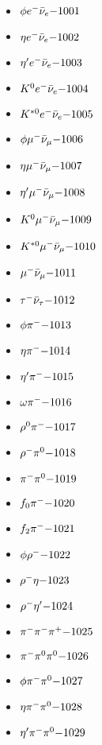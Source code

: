 
 \begin{multicols}{3} 
 \begin{itemize}
 \item $ \phi e^{-} \bar{\nu}_{e} \hfill{-1001}$
 \item $ \eta e^{-} \bar{\nu}_{e} \hfill{-1002}$
 \item $ {\eta^{\prime}} e^{-} \bar{\nu}_{e} \hfill{-1003}$
 \item $ K^{0} e^{-} \bar{\nu}_{e} \hfill{-1004}$
 \item $ K^{*0} e^{-} \bar{\nu}_{e} \hfill{-1005}$
 \item $ \phi \mu^{-} \bar{\nu}_{\mu} \hfill{-1006}$
 \item $ \eta \mu^{-} \bar{\nu}_{\mu} \hfill{-1007}$
 \item $ {\eta^{\prime}} \mu^{-} \bar{\nu}_{\mu} \hfill{-1008}$
 \item $ K^{0} \mu^{-} \bar{\nu}_{\mu} \hfill{-1009}$
 \item $ K^{*0} \mu^{-} \bar{\nu}_{\mu} \hfill{-1010}$
 \item $ \mu^{-} \bar{\nu}_{\mu} \hfill{-1011}$
 \item $ \tau^{-} \bar{\nu}_{\tau} \hfill{-1012}$
 \item $ \phi \pi^{-} \hfill{-1013}$
 \item $ \eta \pi^{-} \hfill{-1014}$
 \item $ {\eta^{\prime}} \pi^{-} \hfill{-1015}$
 \item $ \omega \pi^{-} \hfill{-1016}$
 \item $ \rho^{0} \pi^{-} \hfill{-1017}$
 \item $ \rho^{-} \pi^{0} \hfill{-1018}$
 \item $ \pi^{-} \pi^{0} \hfill{-1019}$
 \item $ f_{0} \pi^{-} \hfill{-1020}$
 \item $ f_{2} \pi^{-} \hfill{-1021}$
 \item $ \phi \rho^{-} \hfill{-1022}$
 \item $ \rho^{-} \eta \hfill{-1023}$
 \item $ \rho^{-} {\eta^{\prime}} \hfill{-1024}$
 \item $ \pi^{-} \pi^{-} \pi^{+} \hfill{-1025}$
 \item $ \pi^{-} \pi^{0} \pi^{0} \hfill{-1026}$
 \item $ \phi \pi^{-} \pi^{0} \hfill{-1027}$
 \item $ \eta \pi^{-} \pi^{0} \hfill{-1028}$
 \item $ {\eta^{\prime}} \pi^{-} \pi^{0} \hfill{-1029}$

\end{itemize}
\end{multicols}
